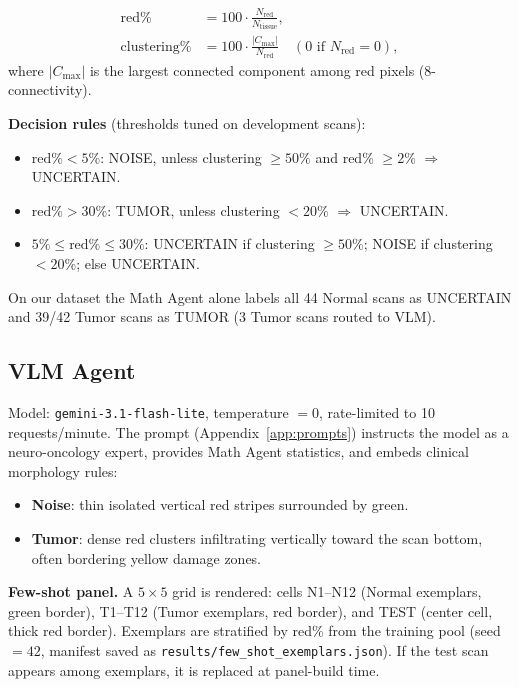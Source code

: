 \documentclass[11pt]{article}
\begin{document}
\begin{align}
  \text{red\%} &= 100 \cdot \frac{N_{\text{red}}}{N_{\text{tissue}}}, \\
  \text{clustering\%} &= 100 \cdot \frac{|C_{\max}|}{N_{\text{red}}} \quad (0 \text{ if } N_{\text{red}}=0),
\end{align}
where $|C_{\max}|$ is the largest connected component among red pixels (8-connectivity).

\textbf{Decision rules} (thresholds tuned on development scans):
\begin{itemize}[nosep]
  \item $\text{red\%} < 5\%$: NOISE, unless clustering $\geq 50\%$ and red\% $\geq 2\%$ $\Rightarrow$ UNCERTAIN.
  \item $\text{red\%} > 30\%$: TUMOR, unless clustering $< 20\%$ $\Rightarrow$ UNCERTAIN.
  \item $5\% \leq \text{red\%} \leq 30\%$: UNCERTAIN if clustering $\geq 50\%$; NOISE if clustering $< 20\%$; else UNCERTAIN.
\end{itemize}

On our dataset the Math Agent alone labels all 44 Normal scans as UNCERTAIN and 39/42 Tumor scans as TUMOR (3 Tumor scans routed to VLM).

\subsection{VLM Agent}

Model: \texttt{gemini-3.1-flash-lite}, temperature $=0$, rate-limited to 10 requests/minute.
The prompt (Appendix~\ref{app:prompts}) instructs the model as a neuro-oncology expert, provides Math Agent statistics, and embeds clinical morphology rules:
\begin{itemize}[nosep]
  \item \textbf{Noise}: thin isolated vertical red stripes surrounded by green.
  \item \textbf{Tumor}: dense red clusters infiltrating vertically toward the scan bottom, often bordering yellow damage zones.
\end{itemize}

\textbf{Few-shot panel.}
A $5\times5$ grid is rendered: cells N1--N12 (Normal exemplars, green border), T1--T12 (Tumor exemplars, red border), and TEST (center cell, thick red border).
Exemplars are stratified by red\% from the training pool (seed $=42$, manifest saved as \texttt{results/few\_shot\_exemplars.json}).
If the test scan appears among exemplars, it is replaced at panel-build time.
\end{document}
